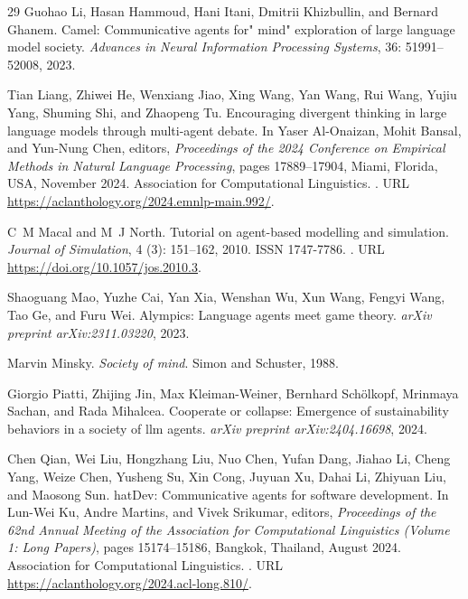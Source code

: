 \begin{thebibliography}{29}
Guohao Li, Hasan Hammoud, Hani Itani, Dmitrii Khizbullin, and Bernard Ghanem.
\newblock Camel: Communicative agents for" mind" exploration of large language model society.
\newblock \emph{Advances in Neural Information Processing Systems}, 36: 51991--52008, 2023.

Tian Liang, Zhiwei He, Wenxiang Jiao, Xing Wang, Yan Wang, Rui Wang, Yujiu Yang, Shuming Shi, and Zhaopeng Tu.
\newblock Encouraging divergent thinking in large language models through multi-agent debate.
\newblock In Yaser Al-Onaizan, Mohit Bansal, and Yun-Nung Chen, editors, \emph{Proceedings of the 2024 Conference on Empirical Methods in Natural Language Processing}, pages 17889--17904, Miami, Florida, USA, November 2024. Association for Computational Linguistics.
\newblock {}.
\newblock URL \url{https://aclanthology.org/2024.emnlp-main.992/}.

C~M Macal and M~J North.
\newblock Tutorial on agent-based modelling and simulation.
\newblock \emph{Journal of Simulation}, 4 (3): 151--162, 2010.
\newblock ISSN 1747-7786.
\newblock {}.
\newblock URL \url{https://doi.org/10.1057/jos.2010.3}.

Shaoguang Mao, Yuzhe Cai, Yan Xia, Wenshan Wu, Xun Wang, Fengyi Wang, Tao Ge, and Furu Wei.
\newblock Alympics: Language agents meet game theory.
\newblock \emph{arXiv preprint arXiv:2311.03220}, 2023.

Marvin Minsky.
\newblock \emph{Society of mind}.
\newblock Simon and Schuster, 1988.

Giorgio Piatti, Zhijing Jin, Max Kleiman-Weiner, Bernhard Sch{\"o}lkopf, Mrinmaya Sachan, and Rada Mihalcea.
\newblock Cooperate or collapse: Emergence of sustainability behaviors in a society of llm agents.
\newblock \emph{arXiv preprint arXiv:2404.16698}, 2024.

Chen Qian, Wei Liu, Hongzhang Liu, Nuo Chen, Yufan Dang, Jiahao Li, Cheng Yang, Weize Chen, Yusheng Su, Xin Cong, Juyuan Xu, Dahai Li, Zhiyuan Liu, and Maosong Sun.
hat{D}ev: Communicative agents for software development.
\newblock In Lun-Wei Ku, Andre Martins, and Vivek Srikumar, editors, \emph{Proceedings of the 62nd Annual Meeting of the Association for Computational Linguistics (Volume 1: Long Papers)}, pages 15174--15186, Bangkok, Thailand, August 2024. Association for Computational Linguistics.
\newblock {}.
\newblock URL \url{https://aclanthology.org/2024.acl-long.810/}.


\end{thebibliography}
